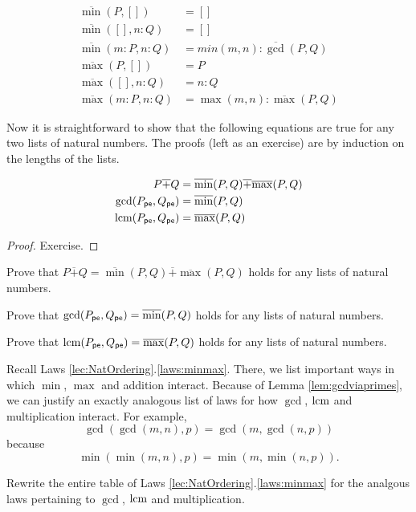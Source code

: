 \begin{align*}
	\overline{\min}(P,[]) &= []\\
	\overline{\min}([],n:Q) &= []\\
	\overline{\min}(m:P, n:Q) &= min(m,n):\overline{\gcd}(P,Q)\\
	\overline{\max}(P,[]) &= P\\
	\overline{\max}([],n:Q) &= n:Q\\
	\overline{\max}(m:P,n:Q) &= \max(m,n):\overline{\max}(P,Q)
\end{align*}

Now it is straightforward to show that the following equations are true for any two lists of natural numbers. The proofs (left as an exercise) are by induction on the lengths of the lists.

\begin{lem}\label{lem:gcdviaprimes}
\begin{align*}
P\overline{+} Q &= \overline{\min}(P,Q) \overline+ \overline{\max}(P,Q)\\
\gcd(P_{{\mathord{\textsf{pe}}}}, Q_{{\mathord{\textsf{pe}}}}) &= \overline{\min}(P,Q)\\
\operatorname{lcm}(P_{{\mathord{\textsf{pe}}}}, Q_{{\mathord{\textsf{pe}}}}) &= \overline{\max}(P,Q)
\end{align*}

\begin{proof}
	Exercise.
\end{proof}
\end{lem}

\begin{exer}
	\begin{exercise}
		\item Prove that $P\overline{+} Q = \overline{\min}(P,Q) \overline+ \overline{\max}(P,Q)$ holds for any lists of natural numbers.
		\item Prove that $\gcd(P_{{\mathord{\textsf{pe}}}}, Q_{{\mathord{\textsf{pe}}}}) = \overline{\min}(P,Q)$ holds for any lists of natural numbers.
		\item Prove that $\operatorname{lcm}(P_{{\mathord{\textsf{pe}}}}, Q_{{\mathord{\textsf{pe}}}}) = \overline{\max}(P,Q)$ holds for any lists of natural numbers.
	\end{exercise}
\end{exer}

Recall Laws \ref{lec:NatOrdering}.\ref{laws:minmax}. There, we list important ways in which $\min$, $\max$ and addition interact.
Because of Lemma \ref{lem:gcdviaprimes}, we can justify an exactly analogous list of laws for how $\gcd$, $\operatorname{lcm}$ and multiplication interact.
For example,
\[\gcd(\gcd(m,n),p) = \gcd(m,\gcd(n,p))\]
because
\[\min(\min(m,n),p) = \min(m,\min(n,p)).\]

\begin{exer}
	\begin{exercise}
		\item Rewrite the entire table of Laws \ref{lec:NatOrdering}.\ref{laws:minmax} for the analgous laws
		pertaining to $\gcd$, $\operatorname{lcm}$ and multiplication.
	\end{exercise}
\end{exer}
